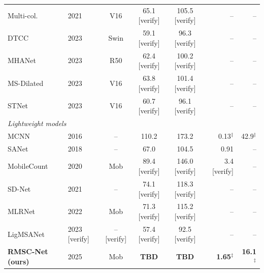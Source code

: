 \begin{table}[t]
\begin{tabular}{llcccrr}
Multi-col.~\cite{multicol}  & 2021 & V16  & 65.1 [verify] & 105.5 [verify] & -- & -- \\ %
DTCC~\cite{dtcc}            & 2023 & Swin & 59.1 [verify] & 96.3 [verify] & -- & -- \\
MHANet~\cite{mhanet}        & 2023 & R50  & 62.4 [verify] & 100.2 [verify] & -- & -- \\
MS-Dilated~\cite{msdilated} & 2023 & V16  & 63.8 [verify] & 101.4 [verify] & -- & -- \\ %
STNet~\cite{stnet}          & 2023 & V16  & 60.7 [verify] & 96.1 [verify] & -- & -- \\
\midrule
\multicolumn{7}{l}{\textit{Lightweight models}} \\
MCNN~\cite{mcnn}            & 2016 & --   & 110.2 & 173.2 & 0.13$^\ddagger$ & 42.9$^\ddagger$ \\
SANet~\cite{sanet}          & 2018 & --   & 67.0 & 104.5 & 0.91 & -- \\
MobileCount~\cite{mobilecount} & 2020 & Mob & 89.4 [verify] & 146.0 [verify] & 3.4 [verify] & -- \\
SD-Net~\cite{sdnet}         & 2021 & --   & 74.1 [verify] & 118.3 [verify] & -- & -- \\
MLRNet~\cite{mlrnet}        & 2022 & Mob  & 71.3 [verify] & 115.2 [verify] & -- & -- \\
LigMSANet~\cite{ligmsanet}  & 2023 [verify] & -- [verify] & 57.4 [verify] & 92.5 [verify] & -- & -- \\
\midrule
\textbf{RMSC-Net (ours)}    & 2025 & Mob  & \textbf{TBD} & \textbf{TBD} & \textbf{1.65}$^\ddagger$ & \textbf{16.1}$^\ddagger$ \\
\bottomrule
\end{tabular}
\end{table}
